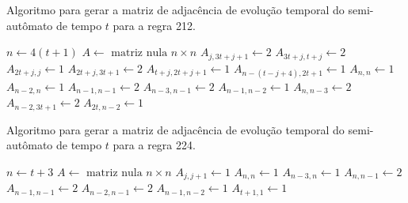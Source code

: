 \documentclass[12pt,a4paper]{article}
\begin{document}
\begin{algorithm}[H]
\caption{Algoritmo para gerar a matriz de adjacência de evolução temporal do
semi-autômato de tempo $t$ para a regra 212.}
\label{alg:r212}
\begin{algorithmic}
\STATE $n \leftarrow 4(t+1)$
\STATE $A \leftarrow \mbox{ matriz nula } n \times n$
    \STATE $A_{j,3t+j+1} \leftarrow 2$
    \STATE $A_{3t+j,t+j} \leftarrow 2$
    \STATE $A_{2t+j,j} \leftarrow 1$
    \STATE $A_{2t+j,3t+1} \leftarrow 2$
\ENDFOR
{}
        \STATE $A_{t+j,2t+j+1} \leftarrow 1$
    \ENDFOR
\ENDIF
{}
    \STATE $A_{n-(t-j+4),2t+1} \leftarrow 1$
\ENDFOR
\STATE $A_{n,n} \leftarrow 1$
\STATE $A_{n-2,n} \leftarrow 1$
\STATE $A_{n-1,n-1} \leftarrow 2$
\STATE $A_{n-3,n-1} \leftarrow 2$
\STATE $A_{n-1,n-2} \leftarrow 1$
\STATE $A_{n,n-3} \leftarrow 2$
\STATE $A_{n-2,3t+1} \leftarrow 2$
\STATE $A_{2t,n-2} \leftarrow 1$
\end{algorithmic}
\end{algorithm}

\begin{algorithm}[H]
\caption{Algoritmo para gerar a matriz de adjacência de evolução temporal do
semi-autômato de tempo $t$ para a regra 224.}
\label{alg:r224}
\begin{algorithmic}
\STATE $n \leftarrow t+3$
\STATE $A \leftarrow \mbox{ matriz nula } n \times n$
    \STATE $A_{j,j+1} \leftarrow 1$
\ENDFOR
\STATE $A_{n,n} \leftarrow 1$
\STATE $A_{n-3,n} \leftarrow 1$
\STATE $A_{n,n-1} \leftarrow 2$
\STATE $A_{n-1,n-1} \leftarrow 2$
\STATE $A_{n-2,n-1} \leftarrow 2$
\STATE $A_{n-1,n-2} \leftarrow 1$
\STATE $A_{t+1,1} \leftarrow 1$
\end{algorithmic}
\end{algorithm}

\end{document}
